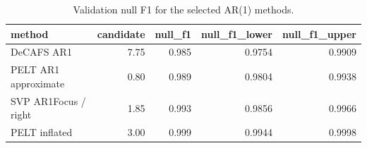 \begin{table}

\caption{Validation null F1 for the selected AR(1) methods.}
\centering
\begin{tabular}[t]{lrrrr}
\toprule
method & candidate & null\_f1 & null\_f1\_lower & null\_f1\_upper\\
\midrule
DeCAFS AR1 & 7.75 & 0.985 & 0.9754 & 0.9909\\
PELT AR1 approximate & 0.80 & 0.989 & 0.9804 & 0.9938\\
SVP AR1Focus / right & 1.85 & 0.993 & 0.9856 & 0.9966\\
PELT inflated & 3.00 & 0.999 & 0.9944 & 0.9998\\
\bottomrule
\end{tabular}
\end{table}
